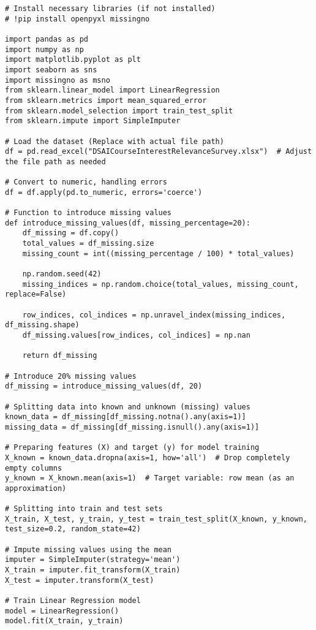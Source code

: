 \documentclass{article}
\begin{document}
\begin{verbatim}
# Install necessary libraries (if not installed)
# !pip install openpyxl missingno

import pandas as pd
import numpy as np
import matplotlib.pyplot as plt
import seaborn as sns
import missingno as msno
from sklearn.linear_model import LinearRegression
from sklearn.metrics import mean_squared_error
from sklearn.model_selection import train_test_split
from sklearn.impute import SimpleImputer

# Load the dataset (Replace with actual file path)
df = pd.read_excel("DSAICourseInterestRelevanceSurvey.xlsx")  # Adjust the file path as needed

# Convert to numeric, handling errors
df = df.apply(pd.to_numeric, errors='coerce')

# Function to introduce missing values
def introduce_missing_values(df, missing_percentage=20):
    df_missing = df.copy()
    total_values = df_missing.size
    missing_count = int((missing_percentage / 100) * total_values)

    np.random.seed(42)
    missing_indices = np.random.choice(total_values, missing_count, replace=False)

    row_indices, col_indices = np.unravel_index(missing_indices, df_missing.shape)
    df_missing.values[row_indices, col_indices] = np.nan

    return df_missing

# Introduce 20% missing values
df_missing = introduce_missing_values(df, 20)

# Splitting data into known and unknown (missing) values
known_data = df_missing[df_missing.notna().any(axis=1)]
missing_data = df_missing[df_missing.isnull().any(axis=1)]

# Preparing features (X) and target (y) for model training
X_known = known_data.dropna(axis=1, how='all')  # Drop completely empty columns
y_known = X_known.mean(axis=1)  # Target variable: row mean (as an approximation)

# Splitting into train and test sets
X_train, X_test, y_train, y_test = train_test_split(X_known, y_known, test_size=0.2, random_state=42)

# Impute missing values using the mean
imputer = SimpleImputer(strategy='mean')
X_train = imputer.fit_transform(X_train)
X_test = imputer.transform(X_test)

# Train Linear Regression model
model = LinearRegression()
model.fit(X_train, y_train)


\end{verbatim}
\end{document}
